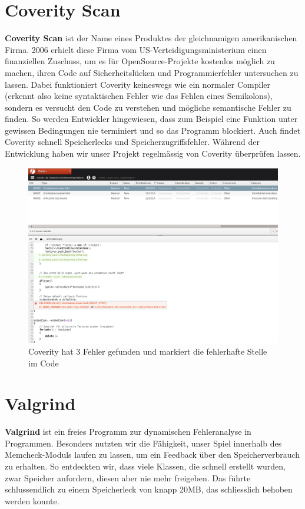 \documentclass[11pt,a4paper]{scrbook}
\begin{document}
\section{Coverity Scan}
\textbf{Coverity Scan} ist der Name eines Produktes der gleichnamigen amerikanischen Firma. 2006 erhielt diese Firma vom US-Verteidigungsministerium
einen finanziellen Zuschuss, um es für OpenSource-Projekte kostenlos möglich zu machen, ihren Code auf Sicherheitslücken und Programmierfehler untersuchen
zu lassen. Dabei funktioniert Coverity keineswegs wie ein normaler Compiler (erkennt also keine syntaktischen Fehler wie das Fehlen eines Semikolons),
sondern es versucht den Code zu verstehen und mögliche semantische Fehler zu finden. So werden Entwickler hingewiesen, dass zum Beispiel eine Funktion
unter gewissen Bedingungen nie terminiert und so das Programm blockiert. Auch findet Coverity schnell Speicherlecks und Speicherzugriffsfehler.
Während der Entwicklung haben wir unser Projekt regelmässig von Coverity überprüfen lassen.
\begin{figure}
\centering
\includegraphics[scale=0.4]{img/coverity.png}
\caption{Coverity hat 3 Fehler gefunden und markiert die fehlerhafte Stelle im Code}
\end{figure}

\section{Valgrind}
\textbf{Valgrind} ist ein freies Programm zur dynamischen Fehleranalyse in Programmen. Besonders nutzten wir die Fähigkeit,
unser Spiel innerhalb des Memcheck-Moduls laufen zu lassen, um ein Feedback über den Speicherverbrauch zu erhalten. So entdeckten
wir, dass viele Klassen, die schnell erstellt wurden, zwar Speicher anfordern, diesen aber nie mehr freigeben. Das führte schlussendlich
zu einem Speicherleck von knapp 20MB,
 das schliesslich behoben werden konnte.
\end{document}

